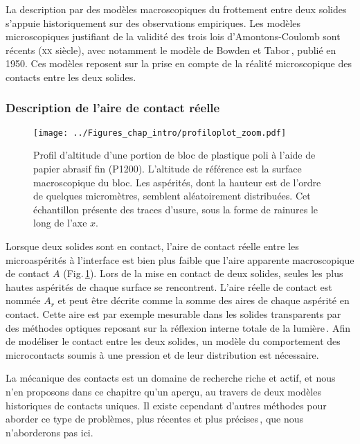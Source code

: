 \label{sec:microfric}



La description par des modèles macroscopiques du frottement entre deux solides s'appuie historiquement sur des observations empiriques. Les modèles microscopiques justifiant de la validité des trois lois d'Amontons-Coulomb sont récents (\textsc{xx} siècle), avec notamment le modèle de Bowden et Tabor\,\cite{bowden_friction_1950}, publié en 1950. Ces modèles reposent sur la prise en compte de la réalité microscopique des contacts entre les deux solides.


\subsubsection{Description de l'aire de contact réelle}

\begin{figure}[h]
\centering	
\texttt{[image: ../Figures\_chap\_intro/profiloplot\_zoom.pdf]}
\caption[Profil microscopique d'un bloc de PMMA]{Profil d'altitude d'une portion de bloc de plastique poli  à l'aide de papier abrasif fin (P1200). L'altitude de référence est la surface macroscopique du bloc. Les aspérités, dont la hauteur est de l'ordre de quelques micromètres, semblent aléatoirement distribuées. Cet échantillon présente des traces d'usure, sous la forme de rainures le long de l'axe $x$.}
\label{fig:asperit2}
\end{figure}


Lorsque deux solides sont en contact, l'aire de contact réelle entre les microaspérités à l'interface est bien plus faible que l'aire apparente macroscopique de contact $A$ (Fig.\,\ref{fig:asperit2}). Lors de la mise en contact de deux solides, seules les plus hautes aspérités de chaque surface se rencontrent. L'aire réelle de contact est nommée $A_r$ et peut être décrite comme la somme des aires de chaque aspérité en contact. Cette aire est par exemple mesurable dans les solides transparents par des méthodes optiques reposant sur la réflexion interne totale de la lumière\,\cite{dieterich_direct_1994}.
Afin de modéliser le contact entre les deux solides, un modèle du comportement des microcontacts soumis à une pression et de leur distribution est nécessaire.

La mécanique des contacts est un domaine de recherche riche et actif, et nous n'en proposons dans ce chapitre qu'un aperçu, au travers de deux modèles historiques de contacts uniques. Il  existe cependant d'autres méthodes pour aborder ce type de problèmes, plus récentes et plus précises\,\cite{greenwood_contact_1966, derjaguin_effect_1975,  johnson_surface_1971, maugis_adhesion_1992, persson_theory_2001, vakis_modeling_2018}, que nous n'aborderons pas ici.




